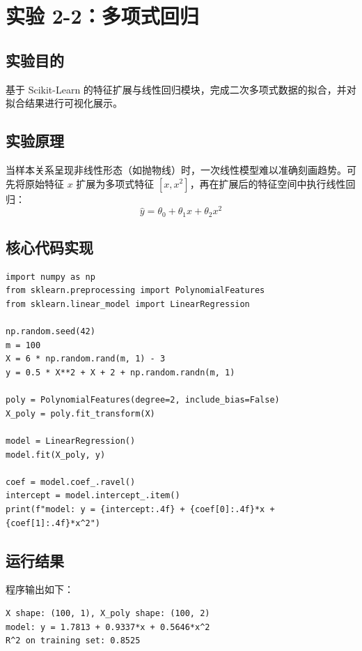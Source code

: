 \documentclass[10.5pt]{config}
\date{\today}
\begin{document}
\makeheader %

\section{实验 2-2：多项式回归}

\subsection{实验目的}
基于 Scikit-Learn 的特征扩展与线性回归模块，完成二次多项式数据的拟合，并对拟合结果进行可视化展示。

\subsection{实验原理}
当样本关系呈现非线性形态（如抛物线）时，一次线性模型难以准确刻画趋势。可先将原始特征 $x$ 扩展为多项式特征 $[x, x^2]$，再在扩展后的特征空间中执行线性回归：
$$\hat{y} = \theta_0 + \theta_1 x + \theta_2 x^2$$

\subsection{核心代码实现}
\begin{listing}[H]
\begin{verbatim}
import numpy as np
from sklearn.preprocessing import PolynomialFeatures
from sklearn.linear_model import LinearRegression

np.random.seed(42)
m = 100
X = 6 * np.random.rand(m, 1) - 3
y = 0.5 * X**2 + X + 2 + np.random.randn(m, 1)

poly = PolynomialFeatures(degree=2, include_bias=False)
X_poly = poly.fit_transform(X)

model = LinearRegression()
model.fit(X_poly, y)

coef = model.coef_.ravel()
intercept = model.intercept_.item()
print(f"model: y = {intercept:.4f} + {coef[0]:.4f}*x + {coef[1]:.4f}*x^2")
\end{verbatim}
\caption{实验2-2核心代码（节选）}
\end{listing}

\subsection{运行结果}
程序输出如下：
\begin{lstlisting}[language={}, numbers=none, frame=single, backgroundcolor=\color{codebg}, basicstyle=\ttfamily\footnotesize, breaklines=true]
X shape: (100, 1), X_poly shape: (100, 2)
model: y = 1.7813 + 0.9337*x + 0.5646*x^2
R^2 on training set: 0.8525
\end{lstlisting}
\end{document}
